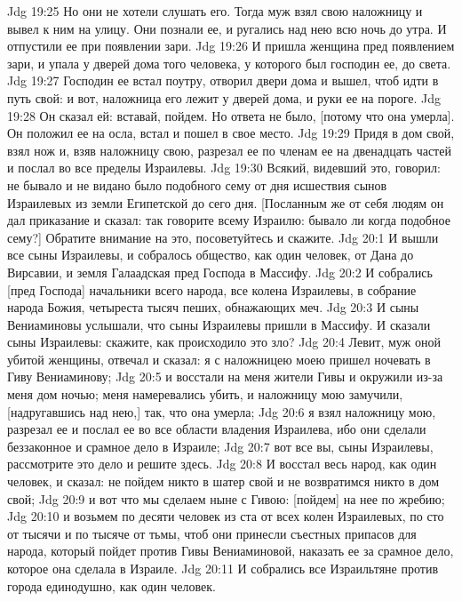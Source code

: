 \vs Jdg 19:25 Но они не хотели слушать его. Тогда муж взял свою наложницу и вывел к ним на улицу. Они познали ее, и ругались над нею всю ночь до утра. И отпустили ее при появлении зари.
\vs Jdg 19:26 И пришла женщина пред появлением зари, и упала у дверей дома того человека, у которого был господин ее,  до света.
\vs Jdg 19:27 Господин ее встал поутру, отворил двери дома и вышел, чтоб идти в путь свой: и вот, наложница его лежит у дверей дома, и руки ее на пороге.
\vs Jdg 19:28 Он сказал ей: вставай, пойдем. Но ответа не было, [потому что она умерла]. Он положил ее на осла, встал и пошел в свое место.
\vs Jdg 19:29 Придя в дом свой, взял нож и, взяв наложницу свою, разрезал ее по членам ее на двенадцать частей и послал во все пределы Израилевы.
\vs Jdg 19:30 Всякий, видевший это, говорил: не бывало и не видано было подобного сему от дня исшествия сынов Израилевых из земли Египетской до сего дня. [Посланным же от себя людям он дал приказание и сказал: так говорите всему Израилю: бывало ли когда подобное сему?] Обратите внимание на это, посоветуйтесь и скажите.
\vs Jdg 20:1 И вышли все сыны Израилевы, и собралось  общество, как один человек, от Дана до Вирсавии, и земля Галаадская пред Господа в Массифу.
\vs Jdg 20:2 И собрались [пред Господа] начальники всего народа, все колена Израилевы, в собрание народа Божия, четыреста тысяч пеших, обнажающих меч.
\vs Jdg 20:3 И сыны Вениаминовы услышали, что сыны Израилевы пришли в Массифу. И сказали сыны Израилевы: скажите, как происходило это зло?
\vs Jdg 20:4 Левит, муж оной убитой женщины, отвечал и сказал: я с наложницею моею пришел ночевать в Гиву Вениаминову;
\vs Jdg 20:5 и восстали на меня жители Гивы и окружили из-за меня дом ночью; меня намеревались убить, и наложницу мою замучили, [надругавшись над нею,] так, что она умерла;
\vs Jdg 20:6 я взял наложницу мою, разрезал ее и послал ее во все области владения Израилева, ибо они сделали беззаконное и срамное дело в Израиле;
\vs Jdg 20:7 вот все вы, сыны Израилевы, рассмотрите это дело и решите здесь.
\vs Jdg 20:8 И восстал весь народ, как один человек, и сказал: не пойдем никто в шатер свой и не возвратимся никто в дом свой;
\vs Jdg 20:9 и вот что мы сделаем ныне с Гивою: [пойдем] на нее по жребию;
\vs Jdg 20:10 и возьмем по десяти человек из ста от всех колен Израилевых, по сто от тысячи и по тысяче от тьмы, чтоб они принесли съестных припасов для народа, который пойдет против Гивы Вениаминовой, наказать ее за срамное дело, которое она сделала в Израиле.
\vs Jdg 20:11 И собрались все Израильтяне против города единодушно, как один человек.
